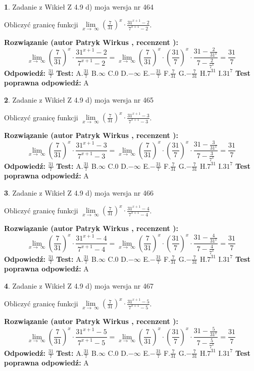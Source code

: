 \documentclass[12pt, a4paper]{article}
\theoremstyle{definition} %
\newtheorem{zad}{}
\newcommand{\zadStart}[1]{\begin{zad}#1\newline}
\newcommand{\zadStop}{\end{zad}}
\newcommand{\rozwStart}[2]{\noindent \textbf{Rozwiązanie (autor #1 , recenzent #2): }\newline}
\newcommand{\rozwStop}{\newline}
\newcommand{\odpStart}{\noindent \textbf{Odpowiedź:}\newline}
\newcommand{\odpStop}{\newline}
\newcommand{\testStart}{\noindent \textbf{Test:}\newline}
\newcommand{\testStop}{\newline}
\newcommand{\kluczStart}{\noindent \textbf{Test poprawna odpowiedź:}\newline}
\newcommand{\kluczStop}{\newline}
\begin{document}
\zadStart{Zadanie z Wikieł Z 4.9 d) moja wersja nr 464}


Obliczyć granicę funkcji  $\lim\limits_{x\to\ \infty}(\frac{7}{31})^{x}\cdot\frac{31^{x+1}-2}{7^{x+1}-2}$.
\zadStop
\rozwStart{Patryk Wirkus}{}
$$\lim\limits_{x\to\ \infty}(\frac{7}{31})^{x}\cdot\frac{31^{x+1}-2}{7^{x+1}-2}=\lim\limits_{x\to\ \infty}(\frac{7}{31})^{x}\cdot(\frac{31}{7})^{x} \cdot \frac{31-\frac{2}{31^{x}}}{7-\frac{2}{7^{x}}} = \frac{31}{7}$$
\rozwStop
\odpStart
$\frac{31}{7}$
\odpStop
\testStart
A.$\frac{31}{7}$ B.$\infty$ C.$0$ D.$-\infty$ E.$-\frac{31}{7}$
F.$\frac{7}{31}$ G.$-\frac{7}{31}$
H.$7^{31}$
I.$31^{7}$
\testStop
\kluczStart
A
\kluczStop



\zadStart{Zadanie z Wikieł Z 4.9 d) moja wersja nr 465}


Obliczyć granicę funkcji  $\lim\limits_{x\to\ \infty}(\frac{7}{31})^{x}\cdot\frac{31^{x+1}-3}{7^{x+1}-3}$.
\zadStop
\rozwStart{Patryk Wirkus}{}
$$\lim\limits_{x\to\ \infty}(\frac{7}{31})^{x}\cdot\frac{31^{x+1}-3}{7^{x+1}-3}=\lim\limits_{x\to\ \infty}(\frac{7}{31})^{x}\cdot(\frac{31}{7})^{x} \cdot \frac{31-\frac{3}{31^{x}}}{7-\frac{3}{7^{x}}} = \frac{31}{7}$$
\rozwStop
\odpStart
$\frac{31}{7}$
\odpStop
\testStart
A.$\frac{31}{7}$ B.$\infty$ C.$0$ D.$-\infty$ E.$-\frac{31}{7}$
F.$\frac{7}{31}$ G.$-\frac{7}{31}$
H.$7^{31}$
I.$31^{7}$
\testStop
\kluczStart
A
\kluczStop



\zadStart{Zadanie z Wikieł Z 4.9 d) moja wersja nr 466}


Obliczyć granicę funkcji  $\lim\limits_{x\to\ \infty}(\frac{7}{31})^{x}\cdot\frac{31^{x+1}-4}{7^{x+1}-4}$.
\zadStop
\rozwStart{Patryk Wirkus}{}
$$\lim\limits_{x\to\ \infty}(\frac{7}{31})^{x}\cdot\frac{31^{x+1}-4}{7^{x+1}-4}=\lim\limits_{x\to\ \infty}(\frac{7}{31})^{x}\cdot(\frac{31}{7})^{x} \cdot \frac{31-\frac{4}{31^{x}}}{7-\frac{4}{7^{x}}} = \frac{31}{7}$$
\rozwStop
\odpStart
$\frac{31}{7}$
\odpStop
\testStart
A.$\frac{31}{7}$ B.$\infty$ C.$0$ D.$-\infty$ E.$-\frac{31}{7}$
F.$\frac{7}{31}$ G.$-\frac{7}{31}$
H.$7^{31}$
I.$31^{7}$
\testStop
\kluczStart
A
\kluczStop



\zadStart{Zadanie z Wikieł Z 4.9 d) moja wersja nr 467}


Obliczyć granicę funkcji  $\lim\limits_{x\to\ \infty}(\frac{7}{31})^{x}\cdot\frac{31^{x+1}-5}{7^{x+1}-5}$.
\zadStop
\rozwStart{Patryk Wirkus}{}
$$\lim\limits_{x\to\ \infty}(\frac{7}{31})^{x}\cdot\frac{31^{x+1}-5}{7^{x+1}-5}=\lim\limits_{x\to\ \infty}(\frac{7}{31})^{x}\cdot(\frac{31}{7})^{x} \cdot \frac{31-\frac{5}{31^{x}}}{7-\frac{5}{7^{x}}} = \frac{31}{7}$$
\rozwStop
\odpStart
$\frac{31}{7}$
\odpStop
\testStart
A.$\frac{31}{7}$ B.$\infty$ C.$0$ D.$-\infty$ E.$-\frac{31}{7}$
F.$\frac{7}{31}$ G.$-\frac{7}{31}$
H.$7^{31}$
I.$31^{7}$
\testStop
\kluczStart
A
\kluczStop
\end{document}
